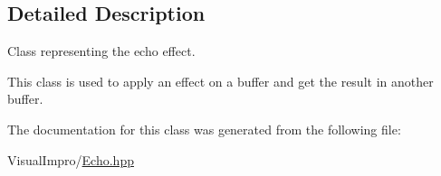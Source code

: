 \subsection{Detailed Description}
Class representing the echo effect. 

This class is used to apply an effect on a buffer and get the result in another buffer. 

The documentation for this class was generated from the following file\+:\begin{DoxyCompactItemize}
\item 
Visual\+Impro/\mbox{\hyperlink{_echo_8hpp}{Echo.\+hpp}}\end{DoxyCompactItemize}
